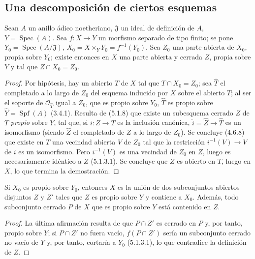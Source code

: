 \subsection{Una descomposición de ciertos esquemas}
\label{subsection:III.5.5}
\label{subsection:III.5.5-fr}

\begin{proposition}[5.5.1]
\label{III.5.5.1-fr}
Sean $A$ un anillo ádico noetheriano, $\mathfrak J$ un ideal de definición
de $A$, $Y=\operatorname{Spec}(A)$. Sea $f:X\to Y$ un morfismo separado de
tipo finito; se pone $Y_0=\operatorname{Spec}(A/\mathfrak J)$,
$X_0=X\times_Y Y_0=f^{-1}(Y_0)$. Sea $Z_0$ una parte abierta de $X_0$,
propia sobre $Y_0$; existe entonces en $X$ una parte abierta y cerrada $Z$,
propia sobre $Y$ y tal que $Z\cap X_0=Z_0$.
\end{proposition}

\begin{proof}
Por hipótesis, hay un abierto $T$ de $X$ tal que $T\cap X_0=Z_0$; sea
$\widehat T$ el completado a lo largo de $Z_0$ del esquema inducido por $X$ sobre
el abierto $T$; al ser el soporte de $\mathcal O_{\widehat T}$ igual a $Z_0$, que es
propio sobre $Y_0$, $\widehat T$ es propio sobre
$\widehat Y=\operatorname{Spf}(A)$ (3.4.1). Resulta de (5.1.8) que existe
un subesquema cerrado $Z$ de $T$ \emph{propio} sobre $Y$, tal que, si $i:Z\to T$ es
la inclusión canónica, $\widehat i=\widehat Z\to\widehat T$ es un
isomorfismo (siendo $\widehat Z$ el completado de $Z$ a lo largo de $Z_0$). Se
concluye (4.6.8) que existe en $T$ una vecindad abierta $V$ de $Z_0$ tal que
la restricción $i^{-1}(V)\to V$ de $i$ es un isomorfismo. Pero
$i^{-1}(V)$ es una vecindad de $Z_0$ en $Z$, luego es necesariamente
idéntico a $Z$ (5.1.3.1). Se concluye que $Z$ es abierto en $T$, luego
en $X$, lo que termina la demostración.
\end{proof}

\begin{corollary}[5.5.2]
\label{III.5.5.2}
\label{III.5.5.2-fr}
Si $X_0$ es propio sobre $Y_0$, entonces $X$ es la unión de dos
subconjuntos abiertos disjuntos $Z$ y $Z'$ tales que $Z$ es propio sobre
$Y$ y contiene a $X_0$. Además, todo subconjunto cerrado $P$ de $X$
que es propio sobre $Y$ está contenido en $Z$.
\end{corollary}

\begin{proof}
La última afirmación resulta de que $P\cap Z'$ es cerrado en $P$ y, por tanto, propio
sobre $Y$; si $P\cap Z'$ no fuera vacío, $f(P\cap Z')$ sería un subconjunto cerrado
no vacío de $Y$ y, por tanto, cortaría a $Y_0$ (5.1.3.1), lo que contradice la
definición de $Z$.
\end{proof}

